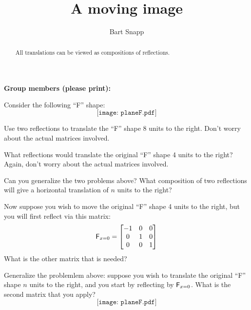 \documentclass[handout,nooutcomes,noauthor]{ximera}
\title{A moving image}
\author{Bart Snapp}
\begin{document}
\begin{abstract}
  All translations can be viewed as compositions of reflections.
\end{abstract}
\maketitle

\noindent\textbf{Group members (please print):}\ \hrulefill \\

\hrulefill



Consider the following ``F'' shape:
\[
\texttt{[image: planeF.pdf]}
\]

\begin{problem}
Use two reflections to translate the ``F'' shape 8 units to the
right. Don't worry about the actual matrices involved.
\end{problem}

\begin{problem}
What reflections would translate the original ``F'' shape 4 units to
the right? Again, don't worry about the actual matrices involved.
\end{problem}

\begin{problem}
Can you generalize the two problems above? What composition of two
reflections will give a horizontal translation of $n$ units to the
right?
\end{problem}

\begin{problem} 
Now suppose you wish to move the original ``F'' shape 4 units to the
right, but you will first reflect via this matrix:
\[
\mathsf{F}_{x=0}  = 
\begin{bmatrix}
-1 & 0 & 0 \\
0 & 1 & 0 \\
0 & 0 & 1
\end{bmatrix}
\]
What is the other matrix that is needed?
\end{problem}

\begin{problem}
Generalize the problemlem above: suppose you wish to translate the
original ``F'' shape $n$ units to the right, and you start by
reflecting by $\mathsf{F}_{x=0}$. What is the second matrix that you
apply?
\[
\texttt{[image: planeF.pdf]}
\]
\end{problem}
\end{document}
